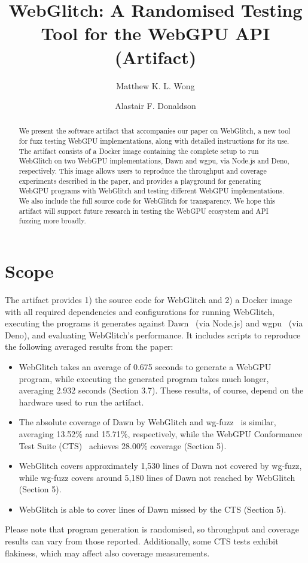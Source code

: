 \documentclass[a4paper,UKenglish]{darts-v2021}
\title{WebGlitch: A Randomised Testing Tool for the WebGPU API (Artifact)} %
\author{Matthew K. L. Wong}{Department of Computing, Imperial College London, United Kingdom}{kwok.wong19@imperial.ac.uk}{https://orcid.org/0009-0004-2776-5430}{}
\author{Alastair F. Donaldson}{Department of Computing, Imperial College London, United Kingdom}{alastair.donaldson@imperial.ac.uk}{https://orcid.org/0000-0002-7448-7961}{}
\newenvironment{scope}{\section{Scope}}{}
\begin{document}
\maketitle

\begin{abstract}
We present the software artifact that accompanies our paper on WebGlitch, a new tool for fuzz testing WebGPU implementations, along with detailed instructions for its use.
The artifact consists of a Docker image containing the complete setup to run WebGlitch on two WebGPU implementations, Dawn and wgpu, via Node.js and Deno, respectively.
This image allows users to reproduce the throughput and coverage experiments described in the paper, and provides a playground for generating WebGPU programs with WebGlitch and testing different WebGPU implementations. 
We also include the full source code for WebGlitch for transparency.
We hope this artifact will support future research in testing the WebGPU ecosystem and API fuzzing more broadly.
 \end{abstract}


\begin{scope}
The artifact provides 1) the source code for WebGlitch and 2) a Docker image with all required dependencies and configurations for running WebGlitch, executing the programs it generates against Dawn~\cite{dawn} (via Node.js) and wgpu~\cite{wgpu} (via Deno), and evaluating WebGlitch's performance. 
It includes scripts to reproduce the following averaged results from the paper:
\begin{itemize}
    \item WebGlitch takes an average of 0.675 seconds to generate a WebGPU program, while executing the generated program takes much longer, averaging 2.932 seconds (Section 3.7). These results, of course, depend on the hardware used to run the artifact.
    \item The absolute coverage of Dawn by WebGlitch and wg-fuzz~\cite{wgfuzz} is similar, averaging 13.52\% and 15.71\%, respectively, while the WebGPU Conformance Test Suite (CTS)~\cite{cts} achieves 28.00\% coverage (Section 5). 
    \item WebGlitch covers approximately 1,530 lines of Dawn not covered by wg-fuzz, while wg-fuzz covers around 5,180 lines of Dawn not reached by WebGlitch (Section 5). 
    \item WebGlitch is able to cover lines of Dawn missed by the CTS (Section 5).
\end{itemize}
Please note that program generation is randomised, so throughput and coverage results can vary from those reported.
Additionally, some CTS tests exhibit flakiness, which may affect also coverage measurements.
\end{scope}
\end{document}
